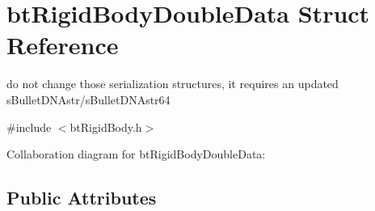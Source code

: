 \hypertarget{structbt_rigid_body_double_data}{\section{bt\+Rigid\+Body\+Double\+Data Struct Reference}
\label{structbt_rigid_body_double_data}
}


do not change those serialization structures, it requires an updated s\+Bullet\+D\+N\+Astr/s\+Bullet\+D\+N\+Astr64  




{\ttfamily \#include $<$bt\+Rigid\+Body.\+h$>$}



Collaboration diagram for bt\+Rigid\+Body\+Double\+Data\+:
\subsection*{Public Attributes}
